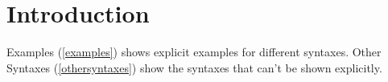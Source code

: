 \chapter{Introduction}
\label{introduction}

Examples (\autoref{examples}) shows explicit examples for different syntaxes. Other Syntaxes (\autoref{othersyntaxes}) show the syntaxes that can't be shown explicitly.

